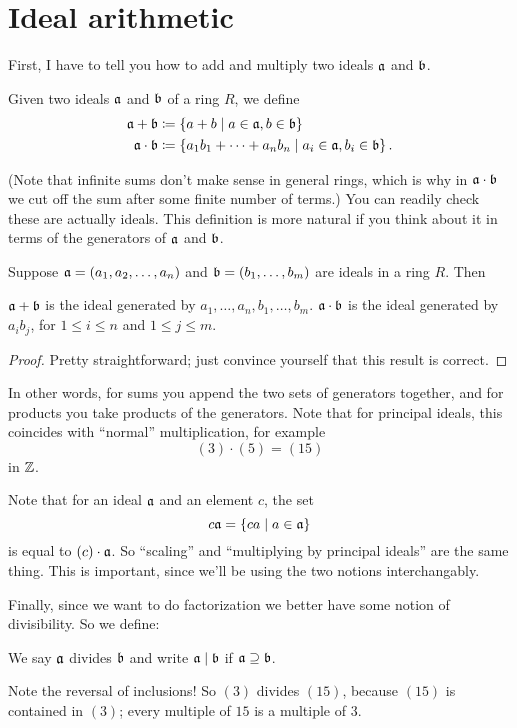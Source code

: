 \section{Ideal arithmetic}
First, I have to tell you how to add and multiply two ideals $\mathfrak a$ and $\mathfrak b$.
\begin{definition}
	Given two ideals $\mathfrak a$ and $\mathfrak b$ of a ring $R$, we define
	\begin{align*}
		\mathfrak a + \mathfrak b &\coloneqq \left\{ a+b \mid a \in \mathfrak a, b \in \mathfrak b \right\} \\
		\mathfrak a \cdot \mathfrak b &\coloneqq \left\{ a_1b_1 + \dots + a_n b_n
			\mid a_i \in \mathfrak a, b_i \in \mathfrak b \right\}.
	\end{align*}
\end{definition}
(Note that infinite sums don't make sense in general rings, which is why in $\mathfrak a \cdot \mathfrak b$
we cut off the sum after some finite number of terms.)
You can readily check these are actually ideals.
This definition is more natural if you think about it in terms of 
the generators of $\mathfrak a$ and $\mathfrak b$.
\begin{proposition}
	Suppose $\mathfrak a = \left( a_1, a_2, \dots, a_n \right)$
	and $\mathfrak b = \left( b_1, \dots, b_m \right)$ are ideals in a ring $R$.
	Then
	\begin{enumerate}[(a)]
		\ii $\mathfrak a + \mathfrak b$ is the ideal generated by $a_1, \dots, a_n, b_1, \dots, b_m$.
		\ii $\mathfrak a \cdot \mathfrak b$ is the ideal generated by $a_i b_j$,
		for $1 \le i \le n$ and $1 \le j \le m$.
	\end{enumerate}
\end{proposition}
\begin{proof}
	Pretty straightforward; just convince yourself that this result is correct.
\end{proof}
In other words, for sums you append the two sets of generators together,
and for products you take products of the generators.
Note that for principal ideals, this coincides with ``normal'' multiplication,
for example
\[ (3) \cdot (5) = (15) \]
in $\mathbb Z$.
\begin{remark}
Note that for an ideal $\mathfrak a$ and an element $c$,
the set \[ c \mathfrak a = \left\{ ca \mid a \in \mathfrak a \right\} \]
is equal to $(c) \cdot \mathfrak a$.
So ``scaling'' and ``multiplying by principal ideals'' are the same thing.
This is important, since we'll be using the two notions interchangably.
\end{remark}

Finally, since we want to do factorization we better have some notion of divisibility.
So we define:
\begin{definition}
	We say $\mathfrak a$ divides $\mathfrak b$ and write $\mathfrak a \mid \mathfrak b$ if $\mathfrak a \supseteq \mathfrak b$.
\end{definition}
Note the reversal of inclusions!
So $(3)$ divides $(15)$, because $(15)$ is contained in $(3)$;
every multiple of $15$ is a multiple of $3$.

